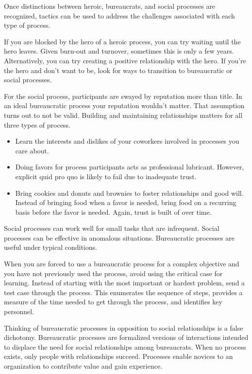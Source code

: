 Once distinctions between heroic, bureaucrats, and social processes are recognized, tactics can be used to address the challenges associated with each type of process.

If you are blocked by the hero of a heroic process, you can try waiting until the hero leaves. Given burn-out and turnover, sometimes this is only a few years. Alternatively, you can try creating a positive relationship with the hero.  If you're the hero and don't want to be, look for ways to transition to bureaucratic or social processes. 


For the social process, participants are swayed by reputation more than title. In an ideal bureaucratic process your reputation wouldn't matter. That assumption turns out to not be valid. Building and maintaining relationships matters for all three types of process.
\begin{itemize}
    \item Learn the interests and dislikes of your coworkers involved in processes you care about.
    \item Doing favors for process participants acts as professional lubricant. However, explicit quid pro quo is likely to fail due to inadequate trust. 
    \item Bring cookies and donuts and brownies to foster relationships and good will. 
%
%
Instead of bringing food when a favor is needed, bring food on a recurring basis before the favor is needed. Again, trust is built of over time. 
\end{itemize}

Social processes can work well for small tasks that are infrequent.
Social processes can be effective in anomalous situations.
Bureaucratic processes are useful under typical conditions.

When you are forced to use a bureaucratic process for a complex objective and you have not previously used the process, avoid using the critical case for learning. Instead of starting with the most important or hardest problem, send a test case through the process. This enumerates the sequence of steps, provides a measure of the time needed to get through the process, and identifies key personnel. 

Thinking of bureaucratic processes in opposition to social relationships is a false dichotomy. Bureaucratic processes are formalized versions of interactions intended to displace the need for social relationships among bureaucrats.
When no process exists, only people with relationships succeed. Processes enable novices to an organization to contribute value and gain experience. 



